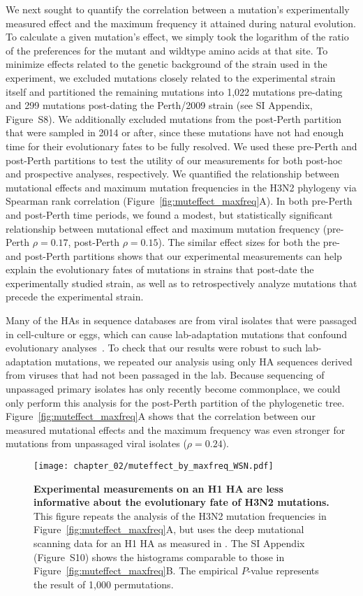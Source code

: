 We next sought to quantify the correlation between a mutation's experimentally measured effect and the maximum frequency it attained during natural evolution.
To calculate a given mutation's effect, we simply took the logarithm of the ratio of the preferences for the mutant and wildtype amino acids at that site.
To minimize effects related to the genetic background of the strain used in the experiment, we excluded mutations closely related to the experimental strain itself and partitioned the remaining mutations into 1,022 mutations pre-dating and 299 mutations post-dating the Perth/2009 strain (see SI Appendix, Figure~S8).
We additionally excluded mutations from the post-Perth partition that were sampled in 2014 or after, since these mutations have not had enough time for their evolutionary fates to be fully resolved.
We used these pre-Perth and post-Perth partitions to test the utility of our measurements for both post-hoc and prospective analyses, respectively.
We quantified the relationship between mutational effects and maximum mutation frequencies in the H3N2 phylogeny via Spearman rank correlation (Figure~\ref{fig:muteffect_maxfreq}A).
In both pre-Perth and post-Perth time periods, we found a modest, but statistically significant relationship between mutational effect and maximum mutation frequency (pre-Perth $\rho = 0.17$, post-Perth $\rho = 0.15$).
The similar effect sizes for both the pre- and post-Perth partitions shows that our experimental measurements can help explain the evolutionary fates of mutations in strains that post-date the experimentally studied strain, as well as to retrospectively analyze mutations that precede the experimental strain.

Many of the HAs in sequence databases are from viral isolates that were passaged in cell-culture or eggs, which can cause lab-adaptation mutations that confound evolutionary analyses~\citep{McWhite:2016fe}.
To check that our results were robust to such lab-adaptation mutations, we repeated our analysis using only HA sequences derived from viruses that had not been passaged in the lab.
Because sequencing of unpassaged primary isolates has only recently become commonplace, we could only perform this analysis for the post-Perth partition of the phylogenetic tree.
Figure~\ref{fig:muteffect_maxfreq}A shows that the correlation between our measured mutational effects and the maximum frequency was even stronger for mutations from unpassaged viral isolates ($\rho = 0.24$).

\begin{figure}
  \centering
  \texttt{[image: chapter\_02/muteffect\_by\_maxfreq\_WSN.pdf]}
  \caption{\label{fig:muteffect_maxfreq_WSN}
    {\bf Experimental measurements on an H1 HA are less informative about the evolutionary fate of H3N2 mutations.}
    This figure repeats the analysis of the H3N2 mutation frequencies in Figure~\ref{fig:muteffect_maxfreq}A, but uses the deep mutational scanning data for an H1 HA as measured in \citep{Doud:2016gm}.
    The SI Appendix (Figure~S10) shows the histograms comparable to those in Figure~\ref{fig:muteffect_maxfreq}B.
    The empirical $P$-value represents the result of 1,000 permutations.
  }
\end{figure}

